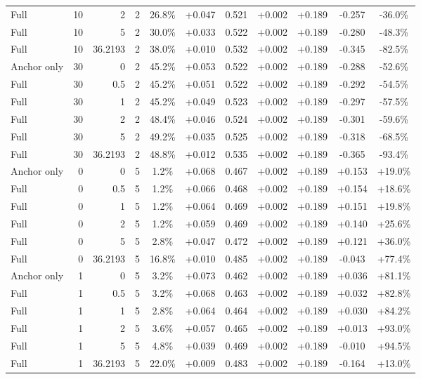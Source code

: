 \begin{table}[htbp]
\begin{tabular}{lrrrccccccc}
Full & 10 & 2 & 2 & 26.8\% & +0.047 & 0.521 & +0.002 & +0.189 & -0.257 & -36.0\% \\
Full & 10 & 5 & 2 & 30.0\% & +0.033 & 0.522 & +0.002 & +0.189 & -0.280 & -48.3\% \\
Full & 10 & 36.2193 & 2 & 38.0\% & +0.010 & 0.532 & +0.002 & +0.189 & -0.345 & -82.5\% \\
Anchor only & 30 & 0 & 2 & 45.2\% & +0.053 & 0.522 & +0.002 & +0.189 & -0.288 & -52.6\% \\
Full & 30 & 0.5 & 2 & 45.2\% & +0.051 & 0.522 & +0.002 & +0.189 & -0.292 & -54.5\% \\
Full & 30 & 1 & 2 & 45.2\% & +0.049 & 0.523 & +0.002 & +0.189 & -0.297 & -57.5\% \\
Full & 30 & 2 & 2 & 48.4\% & +0.046 & 0.524 & +0.002 & +0.189 & -0.301 & -59.6\% \\
Full & 30 & 5 & 2 & 49.2\% & +0.035 & 0.525 & +0.002 & +0.189 & -0.318 & -68.5\% \\
Full & 30 & 36.2193 & 2 & 48.8\% & +0.012 & 0.535 & +0.002 & +0.189 & -0.365 & -93.4\% \\
Anchor only & 0 & 0 & 5 & 1.2\% & +0.068 & 0.467 & +0.002 & +0.189 & +0.153 & +19.0\% \\
Full & 0 & 0.5 & 5 & 1.2\% & +0.066 & 0.468 & +0.002 & +0.189 & +0.154 & +18.6\% \\
Full & 0 & 1 & 5 & 1.2\% & +0.064 & 0.469 & +0.002 & +0.189 & +0.151 & +19.8\% \\
Full & 0 & 2 & 5 & 1.2\% & +0.059 & 0.469 & +0.002 & +0.189 & +0.140 & +25.6\% \\
Full & 0 & 5 & 5 & 2.8\% & +0.047 & 0.472 & +0.002 & +0.189 & +0.121 & +36.0\% \\
Full & 0 & 36.2193 & 5 & 16.8\% & +0.010 & 0.485 & +0.002 & +0.189 & -0.043 & +77.4\% \\
Anchor only & 1 & 0 & 5 & 3.2\% & +0.073 & 0.462 & +0.002 & +0.189 & +0.036 & +81.1\% \\
Full & 1 & 0.5 & 5 & 3.2\% & +0.068 & 0.463 & +0.002 & +0.189 & +0.032 & +82.8\% \\
Full & 1 & 1 & 5 & 2.8\% & +0.064 & 0.464 & +0.002 & +0.189 & +0.030 & +84.2\% \\
Full & 1 & 2 & 5 & 3.6\% & +0.057 & 0.465 & +0.002 & +0.189 & +0.013 & +93.0\% \\
Full & 1 & 5 & 5 & 4.8\% & +0.039 & 0.469 & +0.002 & +0.189 & -0.010 & +94.5\% \\
Full & 1 & 36.2193 & 5 & 22.0\% & +0.009 & 0.483 & +0.002 & +0.189 & -0.164 & +13.0\% \\

\end{tabular}
\end{table}
